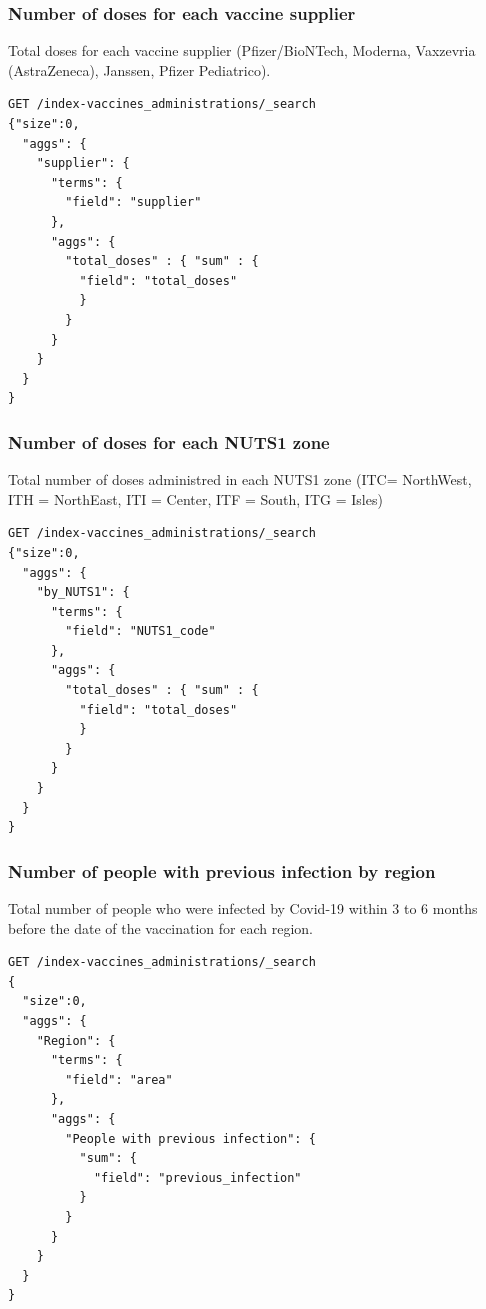 \documentclass[12pt, a4paper]{article}
\begin{document}
\subsubsection{Number of doses for each vaccine supplier}
Total doses for each vaccine supplier (Pfizer/BioNTech, Moderna, Vaxzevria  \\
(AstraZeneca), Janssen, Pfizer Pediatrico).
\begin{tcolorbox}[fontupper=\scriptsize]
  \begin{verbatim}
GET /index-vaccines_administrations/_search
{"size":0,
  "aggs": {
    "supplier": {
      "terms": {
        "field": "supplier"
      },
      "aggs": {
        "total_doses" : { "sum" : {
          "field": "total_doses"
          }
        }
      }
    }
  }
}
  \end{verbatim}
\end{tcolorbox}

\subsubsection{Number of doses for each NUTS1 zone}
Total number of doses administred in each NUTS1 zone (ITC= NorthWest, \\ 
ITH = NorthEast, ITI = Center, ITF = South, ITG = Isles)
\begin{tcolorbox}[fontupper=\scriptsize]
  \begin{verbatim}
GET /index-vaccines_administrations/_search
{"size":0,
  "aggs": {
    "by_NUTS1": {
      "terms": {
        "field": "NUTS1_code"
      },
      "aggs": {
        "total_doses" : { "sum" : {
          "field": "total_doses"
          }
        }
      }
    }
  }
}
  \end{verbatim}
\end{tcolorbox}

\subsubsection{Number of people with previous infection by region}
Total number of people who were infected by Covid-19 within 3 to 6 months before the 
date of the vaccination for each region.
\begin{tcolorbox}[fontupper=\scriptsize]
  \begin{verbatim}
GET /index-vaccines_administrations/_search
{
  "size":0,
  "aggs": {
    "Region": {
      "terms": {
        "field": "area"
      },
      "aggs": {
        "People with previous infection": {
          "sum": {
            "field": "previous_infection"
          }
        }
      }
    }
  }
}
  \end{verbatim}
\end{tcolorbox}
\end{document}
